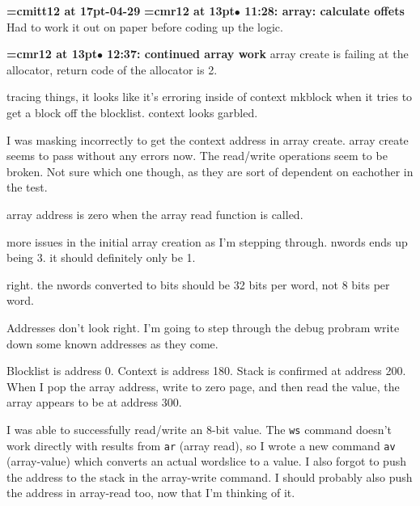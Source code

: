 {\medskip\noindent\bf\font\titlefont=cmitt12 at 17pt-04-29}\medskip
{\smallskip\noindent\bf\font\titlefont=cmr12 at 13pt\titlefont $\bullet$ 11:28: array: calculate offets}\smallskip
Had to work it out on paper before coding up the logic.
\par

{\smallskip\noindent\bf\font\titlefont=cmr12 at 13pt\titlefont $\bullet$ 12:37: continued array work}\smallskip
array create is failing at the allocator, return code of the allocator is 2.
\par

tracing things, it looks like it's erroring inside of context mkblock when it tries to get a block off the blocklist. context looks garbled.
\par

I was masking incorrectly to get the context address in array create. array create seems to pass without any errors now. The read/write operations seem to be broken. Not sure which one though, as they are sort of dependent on eachother in the test.
\par

array address is zero when the array read function is called.
\par

more issues in the initial array creation as I'm stepping through. nwords ends up being 3. it should definitely only be 1.
\par

right. the nwords converted to bits should be 32 bits per word, not 8 bits per word.
\par

Addresses don't look right. I'm going to step through the debug probram write down some known addresses as they come.
\par

Blocklist is address 0. Context is address 180. Stack is confirmed at address 200. When I pop the array address,  write to zero page, and then read the value, the array appears to be at address 300.
\par

I was able to successfully read/write an 8-bit value. The {\tt ws} command doesn't work directly with results from {\tt ar} (array read), so I wrote a new command {\tt av} (array-value) which converts an actual wordslice to a value. I also forgot to push the address to the stack in the array-write command. I should probably also push the address in array-read too, now that I'm thinking of it.
\par

